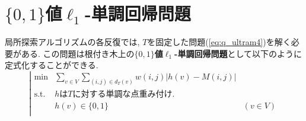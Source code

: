 \documentclass[a4paper,dvipdfmx]{jsarticle}
\begin{document}
\section{$\{0, 1\}$値$\ell_1$-単調回帰問題}
局所探索アルゴリズムの各反復では, $T$を固定した問題(\ref{eq:q_ultram4})を解く必要がある. この問題は根付き木上の{\bf$\{0, 1\}$値$\ell_1$-単調回帰問題}として以下のように定式化することができる.  
\begin{equation}\label{eq:q_ultram5}
\left|\begin{array}{lll}
\min & \displaystyle \sum_{v \in V} \sum_{(i,j) \in d_T(v)} w(i,j)|h(v) - M(i,j)|& \\
\mbox{s.t.} &hはTに対する単調な点重み付け. & \\
& h(v) \in \{0,1\} &(v \in V) \\
\end{array}
\right.
\end{equation}

\end{document}
